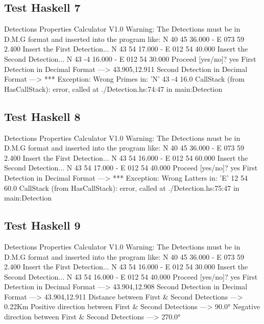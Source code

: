 \documentclass{article}
\begin{document}
\subsection*{Test Haskell 7}
	\begin{spverbatim}
		Detections Properties Calculator V1.0 
		Warning: The Detections must be in D.M.G format and inserted into the program like: N 40 45 36.000 - E 073 59 2.400
		Insert the First Detection...
		N 43 54 17.000 - E 012 54 40.000
		Insert the Second Detection...
		N 43 -4 16.000 - E 012 54 30.000
		Proceed [yes/no]?
		yes
		First Detection in Decimal Format ---> 43.905,12.911
		Second Detection in Decimal Format ---> *** Exception: Wrong Primes in:  'N' 43 -4 16.0
		CallStack (from HasCallStack):
		error, called at ./Detection.hs:74:47 in main:Detection
	\end{spverbatim}

\subsection*{Test Haskell 8}
	\begin{spverbatim}
		Detections Properties Calculator V1.0 
		Warning: The Detections must be in D.M.G format and inserted into the program like: N 40 45 36.000 - E 073 59 2.400
		Insert the First Detection...
		N 43 54 16.000 - E 012 54 60.000
		Insert the Second Detection...
		N 43 54 17.000 - E 012 54 40.000
		Proceed [yes/no]?
		yes
		First Detection in Decimal Format ---> *** Exception: Wrong Latters in:  'E' 12 54 60.0
		CallStack (from HasCallStack):
		error, called at ./Detection.hs:75:47 in main:Detection
	\end{spverbatim}

\subsection*{Test Haskell 9}
	\begin{spverbatim}
		Detections Properties Calculator V1.0 
		Warning: The Detections must be in D.M.G format and inserted into the program like: N 40 45 36.000 - E 073 59 2.400
		Insert the First Detection...
		N 43 54 16.000 - E 012 54 30.000
		Insert the Second Detection...
		N 43 54 16.000 - E 012 54 40.000
		Proceed [yes/no]?
		yes
		First Detection in Decimal Format ---> 43.904,12.908
		Second Detection in Decimal Format ---> 43.904,12.911
		Distance between First & Second Detections ---> 0.22Km
		Positive direction between First & Second Detections ---> 90.0°
		Negative direction between First & Second Detections ---> 270.0°
	\end{spverbatim}
\end{document}
